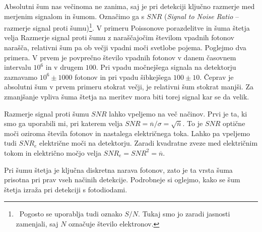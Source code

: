 Absolutni šum nas večinoma ne zanima, 
saj je pri detekciji ključno razmerje med merjenim 
signalom in šumom. 
Označimo ga s $SNR$ ({\it Signal to Noise Ratio} --
razmerje 
signal proti šumu)\footnote{~Pogosto se uporablja tudi oznako $S/N$. Tukaj smo jo 
zaradi jasnosti zamenjali, saj $N$ označuje število elektronov.}.
V primeru Poissonove porazdelitve in šuma štetja velja
Razmerje signal proti šumu z naraščajočim številom vpadnih fotonov narašča, 
relativni šum pa ob večji vpadni moči svetlobe pojema. 
Poglejmo dva primera. V prvem je povprečno število vpadnih 
fotonov v danem časovnem intervalu $10^6$ in v drugem $100$. 
Pri vpadu močnejšega signala 
na detektorju zaznavamo $10^6 \pm 1000$ fotonov in pri vpadu šibkejšega
$100 \pm 10$. Čeprav je absolutni šum v prvem primeru stokrat večji, 
je relativni šum stokrat manjši. Za zmanjšanje vpliva šuma štetja na meritev mora biti 
torej signal kar se da velik. 

\begin{remark}
Razmerje signal proti šumu $SNR$ lahko vpeljemo na več načinov. Prvi je ta, ki smo ga 
uporabili mi, pri katerem velja $SNR = \overline{n}/\sigma = \sqrt{\overline{n}}$. To je
$SNR$ optične moči oziroma števila fotonov in nastalega električnega toka. Lahko
pa vpeljemo tudi $SNR_e$ električne moči na detektorju.
Zaradi kvadratne zveze med električnim tokom in električno močjo velja 
$SNR_e=SNR^2={\overline{n}}$.
\end{remark}

Pri šumu štetja je ključna diskretna narava fotonov, zato je ta vrsta šuma
prisotna pri prav vseh načinih detekcije. Podrobneje si oglejmo, 
kako se šum štetja izraža pri detekciji s fotodiodami. 

